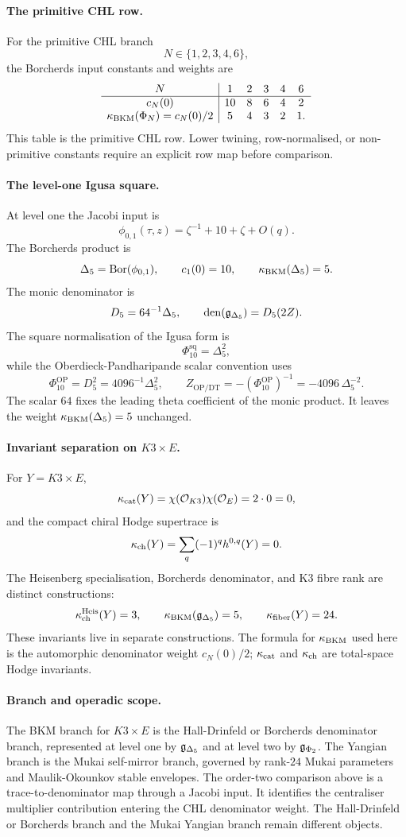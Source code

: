 \paragraph{The primitive CHL row.}
For the primitive CHL branch
\[
 N\in\{1,2,3,4,6\},
\]
the Borcherds input constants and weights are
\[
\begin{array}{c|ccccc}
N & 1 & 2 & 3 & 4 & 6\\
\hline
c_N(0) & 10 & 8 & 6 & 4 & 2\\
\kappa_{\mathrm{BKM}}(\Phi_N)=c_N(0)/2 & 5 & 4 & 3 & 2 & 1 .
\end{array}
\]
This table is the primitive CHL row.  Lower twining, row-normalised, or
non-primitive constants require an explicit row map before comparison.

\paragraph{The level-one Igusa square.}
At level one the Jacobi input is
\[
 \phi_{0,1}(\tau,z)=\zeta^{-1}+10+\zeta+O(q).
\]
The Borcherds product is
\[
 \Delta_5=\operatorname{Bor}(\phi_{0,1}),\qquad c_1(0)=10,\qquad
 \kappa_{\mathrm{BKM}}(\Delta_5)=5.
\]
The monic denominator is
\[
 D_5=64^{-1}\Delta_5,\qquad
 \operatorname{den}(\mathfrak g_{\Delta_5})=D_5(2Z).
\]
The square normalisation of the Igusa form is
\[
 \Phi_{10}^{\mathrm{sq}}=\Delta_5^2,
\]
while the Oberdieck-Pandharipande scalar convention uses
\[
 \Phi_{10}^{\mathrm{OP}}=D_5^2=4096^{-1}\Delta_5^2,\qquad
 Z_{\mathrm{OP/DT}}=-(\Phi_{10}^{\mathrm{OP}})^{-1}
  =-4096\,\Delta_5^{-2}.
\]
The scalar \(64\) fixes the leading theta coefficient of the monic
product.  It leaves the weight \(\kappa_{\mathrm{BKM}}(\Delta_5)=5\) unchanged.

\paragraph{Invariant separation on \(K3\times E\).}
For \(Y=K3\times E\),
\[
 \kappa_{\mathrm{cat}}(Y)=\chi(\mathcal O_{K3})\chi(\mathcal O_E)=2\cdot0=0,
\]
and the compact chiral Hodge supertrace is
\[
 \kappa_{\mathrm{ch}}(Y)=\sum_q(-1)^q h^{0,q}(Y)=0.
\]
The Heisenberg specialisation, Borcherds denominator, and K3 fibre
rank are distinct constructions:
\[
 \kappa_{\mathrm{ch}}^{\mathrm{Heis}}(Y)=3,\qquad
 \kappa_{\mathrm{BKM}}(\mathfrak g_{\Delta_5})=5,\qquad
 \kappa_{\mathrm{fiber}}(Y)=24.
\]
These invariants live in separate constructions.  The formula for
\(\kappa_{\mathrm{BKM}}\) used here is the automorphic denominator weight \(c_N(0)/2\);
\(\kappa_{\mathrm{cat}}\) and \(\kappa_{\mathrm{ch}}\) are total-space Hodge invariants.

\paragraph{Branch and operadic scope.}
The BKM branch for \(K3\times E\) is the Hall-Drinfeld or Borcherds
denominator branch, represented at level one by \(\mathfrak g_{\Delta_5}\) and
at level two by \(\mathfrak g_{\Phi_2}\).  The Yangian branch is the Mukai
self-mirror branch, governed by rank-\(24\) Mukai parameters and
Maulik-Okounkov stable envelopes.  The order-two comparison above is a
trace-to-denominator map through a Jacobi input.  It identifies the
centraliser multiplier contribution entering the CHL denominator
weight.  The Hall-Drinfeld or Borcherds branch and the Mukai Yangian
branch remain different objects.

